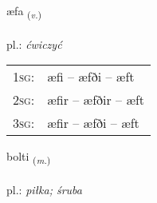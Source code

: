 \documentclass[frontgrid, backgrid]{flacards}\usepackage[]{graphicx}\usepackage[]{xcolor}
\begin{document}
\renewcommand{\blhead}{\vskip5pt {\small\bfseries\footnotesize Sagnorð | Verb }}
\renewcommand{\bcfoot}{\vskip5pt \hspace{2pt}{\small\bfseries\footnotesize 2K}}


{æfa \small{\textsubscript{(\textit{v.})}} \\[1ex] %
\textphonetic{[aiːva]} \\
pl.: \emph{ćwiczyć} \\  [2ex]
\renewcommand*{\arraystretch}{0.8}
\begin{tabular}{p{1cm}l}
\textsc{1sg}: & æfi -- æfði -- æft \\ 
\textsc{2sg}: & æfir -- æfðir -- æft \\ 
\textsc{3sg}: & æfir -- æfði -- æft \\ 
\end{tabular}
}

\renewcommand{\flhead}{\vskip5pt \fboxsep=0pt {\small\bfseries\footnotesize Nafnorð | Noun}}
\renewcommand{\fcfoot}{\vskip5pt \fboxsep=0pt \hspace{2pt}{\small\bfseries\footnotesize 2K}}

\renewcommand{\blhead}{\vskip5pt {\small\bfseries\footnotesize Nafnorð | Noun }}
\renewcommand{\bcfoot}{\vskip5pt \hspace{2pt}{\small\bfseries\footnotesize 2K}}


{bolti \small{\textsubscript{(\textit{m.})}} \\[1ex] %
\textphonetic{[pɔl̥tɪ]} \\
pl.: \emph{piłka; śruba} \\  [2ex]
\renewcommand*{\arraystretch}{0.8}
}


\renewcommand{\flhead}{\vskip5pt \fboxsep=0pt {\small\bfseries\footnotesize Atviksorð | Adverb}}
\renewcommand{\fcfoot}{\vskip5pt \fboxsep=0pt \hspace{2pt}{\small\bfseries\footnotesize 2K}}
\end{document}
